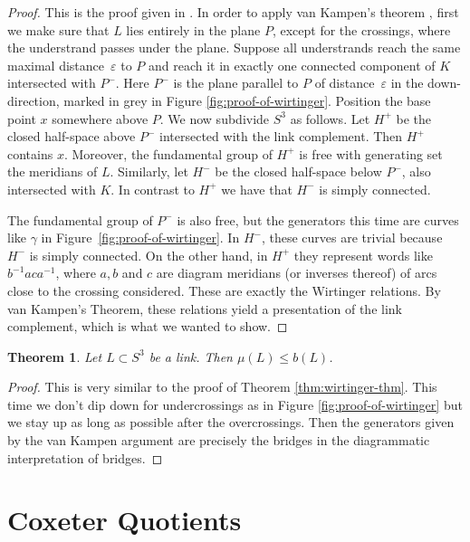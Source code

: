 \documentclass{article}
\newtheorem{theorem}{Theorem}[section]
\theoremstyle{definition}
\begin{document}
\begin{proof}
This is the proof given in \cite{rolfsen2003}. In order to apply van Kampen's theorem \cite{hatcher2002}, first we make sure that $L$ lies entirely in the plane $P$, except for the crossings, where the understrand passes under the plane. Suppose all understrands reach the same maximal distance~$\varepsilon$ to $P$ and reach it in exactly one connected component of $K$ intersected with $P^{-}$. Here $P^-$ is the plane parallel to $P$ of distance~$\varepsilon$ in the down-direction, marked in grey in Figure \ref{fig:proof-of-wirtinger}.
Position the base point $x$ somewhere above $P$. We now subdivide $S^3$ as follows.
Let $H^+$ be the closed half-space above $P^-$ intersected with the link complement. Then $H^+$ contains $x$. Moreover, the fundamental group of $H^+$ is free with generating set the meridians of $L$. Similarly, let $H^-$ be the closed half-space below $P^-$, also intersected with $K$. In contrast to $H^+$ we have that $H^-$ is simply connected.

The fundamental group of $P^-$ is also free, but the generators this time are curves like $\gamma$ in Figure~\ref{fig:proof-of-wirtinger}. In $H^-$, these curves are trivial because $H^-$ is simply connected. On the other hand, in $H^+$ they represent words like $b^{-1}aca^{-1}$, where $a, b$ and $c$ are diagram meridians (or inverses thereof) of arcs close to the crossing considered. These are exactly the Wirtinger relations.
By van Kampen's Theorem, these relations yield a presentation of the link complement, which is what we wanted to show.
\end{proof}

\begin{theorem}\label{thm:mr<=b}
Let $L \subset S^3$ be a link. Then $\mu(L) \leq b(L)$.
\end{theorem}

\begin{proof}
This is very similar to the proof of Theorem \ref{thm:wirtinger-thm}. This time we don't dip down for undercrossings as in Figure \ref{fig:proof-of-wirtinger} but we stay up as long as possible after the overcrossings. Then the generators given by the van Kampen argument are precisely the bridges in the diagrammatic interpretation of bridges.
\end{proof}

\newpage


\section{Coxeter Quotients}
\end{document}
